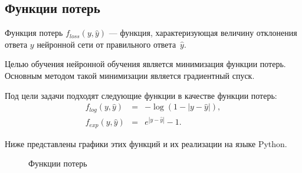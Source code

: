 \subsection{Функции потерь}\label{subsec:losses}

\begin{definition}
  Функция потерь $f_{loss}(y, \hat{y})$ --- функция, характеризующая величину отклонения ответа $y$ нейронной сети от правильного ответа~$\hat{y}$.
\end{definition}

Целью обучения нейронной обучения является минимизация функции потерь. Основным методом такой минимизации является градиентный спуск\cite[с.\,151]{bib:neural_networks2}.

Под цели задачи подходят следующие функции в качестве функции потерь:
\begin{eqnarray}
  \nonumber f_{log}(y, \hat{y}) &=& -\log(1 - |y-\hat{y}|), \\
  \nonumber f_{exp}(y, \hat{y}) &=& e^{|y-\hat{y}|} - 1.
\end{eqnarray}

Ниже представлены графики этих функций и их реализации на языке Python.
\begin{figure}[h]
\caption{Функции потерь}\label{fig:custom_losses}
\end{figure}



\newpage 